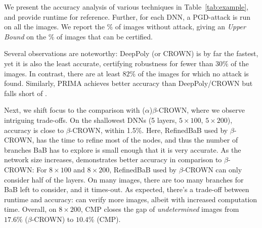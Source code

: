 We present the accuracy analysis of various techniques in Table~\ref{tab:example}, and provide runtime for reference. Further, for each DNN, a PGD-attack \cite{attack} is run 
on all the images. We report the $\%$ of images without attack, giving an {\em Upper Bound} on the $\%$ of images that can be certified.

Several observations are noteworthy: DeepPoly (or CROWN) is by far the fastest, yet it is also the least accurate, certifying robustness for fewer than $30\%$ of the images. In contrast, there are at least $82\%$ of the images for which no attack is found. Similarly, PRIMA achieves better accuracy than DeepPoly/CROWN but falls short of \toolname. 

Next, we shift focus to the comparison with ($\alpha$)$\beta$-CROWN, where we observe intriguing trade-offs. On the shallowest DNNs (5 layers, $5 \times 100$, $5 \times 200$), \toolname accuracy is close to $\beta$-CROWN, within 1.5\%. Here, RefinedBaB used by $\beta$-CROWN, has the time to refine most of the nodes, and thus the number of branches BaB has to explore is small enough that it is very accurate.
As the network size increases, \toolname demonstrates better accuracy in comparison to $\beta$-CROWN: For $8 \times 100$ and $8 \times 200$, 
RefinedBaB used by $\beta$-CROWN can only consider half of the layers. 
On many images, there are too many branches for BaB left to consider, and it times-out.
As expected, there's a trade-off between runtime and accuracy: \toolname can verify more images, albeit with increased computation time. Overall, on $8 \times 200$, CMP closes the gap of {\em undetermined} images from $17.6\%$ ($\beta$-CROWN) to $10.4\%$ (CMP).


